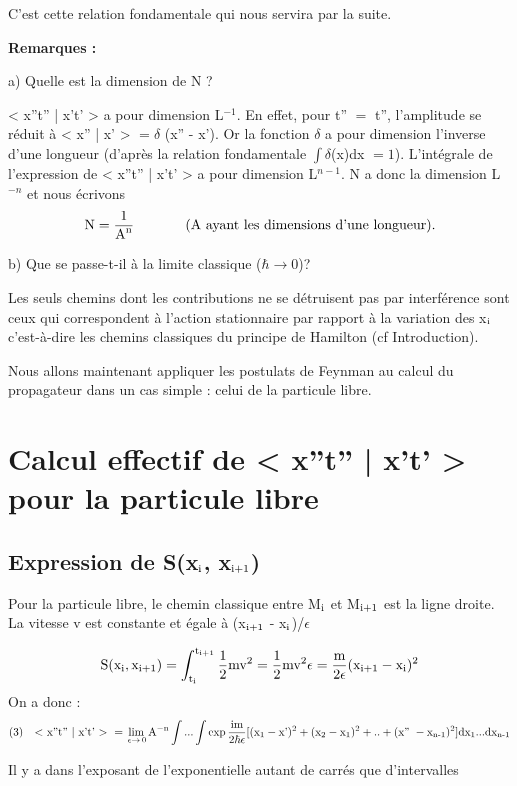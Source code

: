 C'est cette relation fondamentale qui nous servira par la suite.

{\bf Remarques :}

a) Quelle est la dimension de N ?

< x''t'' | x't' > a pour dimension L$^{-1}$. En effet, pour t'' $=$ t'',
l'amplitude se réduit à < x'' | x' > $= \delta$  (x'' - x'). Or la fonction
$\delta$ a pour dimension l'inverse d'une longueur (d'après la relation
fondamentale $\int \delta$(x)dx $=1$). L'intégrale de l'expression de < x''t'' | x't' > 
a pour dimension L$^{n-1}$. N a donc la dimension L$^{-n}$ et nous écrivons
\[
\text{N}=\frac{1}{\text{A}^{\text{n}}}
\ \ \ \ \ \ \ \ \ \ \ \text{(A ayant les dimensions d'une longueur).}
\]
 
b) Que se passe-t-il à la limite classique ($\hbar \to 0$)?

Les seuls chemins dont les contributions ne se détruisent pas par
interférence sont ceux qui correspondent à l'action stationnaire
par rapport à la variation des x$_{\text{i}}$ c'est-à-dire les chemins classiques
du principe de Hamilton (cf Introduction).

Nous allons maintenant appliquer les postulats de Feynman au
calcul du propagateur dans un cas simple : celui de la particule libre.

\section{Calcul effectif de < x''t'' | x't' > pour la particule libre}

\subsection{Expression de S(x$_{\text{i}}$, x$_{\text{i+1}}$)}

Pour la particule libre, le chemin classique entre M$_{\text{i}}$ et M$_{\text{i+1}}$
est la ligne droite. La vitesse v est constante et égale à
(x$_{\text{i+1}}$ - x$_{\text{i}}$)/$\epsilon$

\[
\text{S}(\text{x}_{\text{i}}, \text{x}_{\text{i+1}}) = \int_{\text{t}_{\text{i}}}^{\text{t}_{\text{i+1}}}
\frac{1}{2}\text{mv}^2 = \frac{1}{2}\text{mv}^2 \epsilon
 = \frac{\text{m}}{2\epsilon}(\text{x}_{\text{i+1}}-\text{x}_{\text{i}})^2
\]
On a donc :
\[
\text{(3)\ \ \ < x''t'' | x't' > } = \lim_{\,\epsilon \to \,0} \text{A}^{-\text{n}}
\int...\int
\exp\frac{\text{im}}{2\hbar\epsilon}
[(\text{x}_1-\text{x'})^2 + (\text{x}_2-\text{x}_1)^2 +..+ (\text{x'' }-\text{x}_{\text{n-1}})^2]
\text{dx}_1...\text{dx}_{\text{n-1}} 
\]

Il y a dans l'exposant de l'exponentielle autant de carrés que d'intervalles

